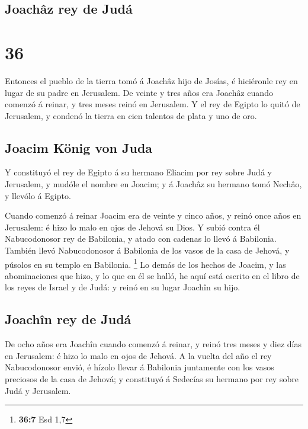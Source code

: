 \hypertarget{joachuxe2z-rey-de-juduxe1}{%
\subsection{Joachâz rey de Judá}\label{joachuxe2z-rey-de-juduxe1}}

\hypertarget{section-35}{%
\section{36}\label{section-35}}

 Entonces el pueblo de la tierra tomó á Joachâz hijo de
Josías, é hiciéronle rey en lugar de su padre en Jerusalem. 
De veinte y tres años era Joachâz cuando comenzó á reinar, y tres meses
reinó en Jerusalem.  Y el rey de Egipto lo quitó de
Jerusalem, y condenó la tierra en cien talentos de plata y uno de oro.

\hypertarget{joacim-kuxf6nig-von-juda}{%
\subsection{Joacim König von Juda}\label{joacim-kuxf6nig-von-juda}}

 Y constituyó el rey de Egipto á su hermano Eliacim por rey
sobre Judá y Jerusalem, y mudóle el nombre en Joacim; y á Joachâz su
hermano tomó Nechâo, y llevólo á Egipto.

 Cuando comenzó á reinar Joacim era de veinte y cinco años,
y reinó once años en Jerusalem: é hizo lo malo en ojos de Jehová su
Dios.  Y subió contra él Nabucodonosor rey de Babilonia, y
atado con cadenas lo llevó á Babilonia.  También llevó
Nabucodonosor á Babilonia de los vasos de la casa de Jehová, y púsolos
en su templo en Babilonia. \footnote{\textbf{36:7} Esd 1,7} 
Lo demás de los hechos de Joacim, y las abominaciones que hizo, y lo que
en él se halló, he aquí está escrito en el libro de los reyes de Israel
y de Judá: y reinó en su lugar Joachîn su hijo.

\hypertarget{joachuxeen-rey-de-juduxe1}{%
\subsection{Joachîn rey de Judá}\label{joachuxeen-rey-de-juduxe1}}

 De ocho años era Joachîn cuando comenzó á reinar, y reinó
tres meses y diez días en Jerusalem: é hizo lo malo en ojos de Jehová.
 A la vuelta del año el rey Nabucodonosor envió, é hízolo
llevar á Babilonia juntamente con los vasos preciosos de la casa de
Jehová; y constituyó á Sedecías su hermano por rey sobre Judá y
Jerusalem.

